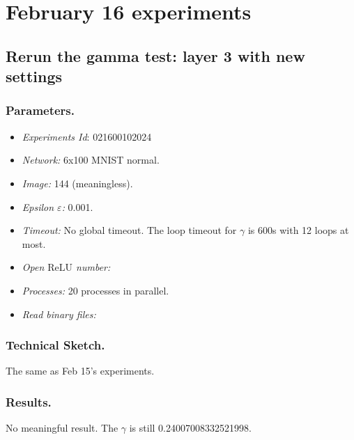 \documentclass{llncs}
\newcommand{\ReLU}{\mathrm{ReLU}}
\begin{document}
\section{February 16 experiments}



\subsection{Rerun the gamma test: layer 3 with new settings}

 

\subsubsection*{Parameters.}

\begin{itemize}
	\item\emph{Experiments Id}: 021600102024
	
	\item\emph{Network:} 6x100 MNIST normal. 
	
	\item\emph{Image:} 144 (meaningless).
	
	\item\emph{Epsilon $\varepsilon$:} 0.001.
	
	\item\emph{Timeout:} No global timeout. The loop timeout for $\gamma$ is 600s with 12 loops at most.
	
	\item\emph{Open $\ReLU$ number:} 
	
	\item\emph{Processes:} 20 processes in parallel.
	
	\item\emph{Read binary files:} 
\end{itemize}


\subsubsection*{Technical Sketch.}

The same as Feb 15's experiments.

\subsubsection*{Results.} No meaningful result. The $\gamma$ is still 0.24007008332521998.
\end{document}
